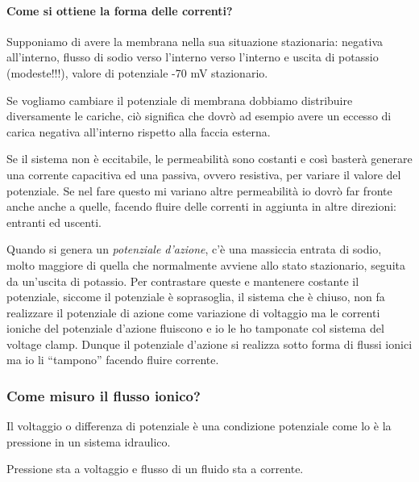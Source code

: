 \documentclass[a4paper,12pt]{article}
\begin{document}
\paragraph{Come si ottiene la forma delle correnti?}

Supponiamo di avere la membrana nella sua situazione stazionaria: negativa all’interno, flusso di sodio verso l’interno verso l’interno e uscita di potassio (modeste!!!), valore di potenziale -70 mV stazionario.

Se vogliamo cambiare il potenziale di membrana dobbiamo distribuire diversamente le cariche, ciò significa che dovrò ad esempio avere un eccesso di carica negativa all’interno rispetto alla faccia esterna. 

Se il sistema non è eccitabile, le permeabilità sono costanti e così basterà generare una corrente capacitiva ed una passiva, ovvero resistiva, per variare il valore del potenziale. Se nel fare questo mi variano altre permeabilità io dovrò far fronte anche anche a quelle, facendo fluire delle correnti in aggiunta in altre direzioni: entranti ed uscenti. 

Quando si genera un \emph{potenziale d’azione}, c’è una massiccia entrata di sodio, molto maggiore di quella che normalmente avviene allo stato stazionario, seguita da un’uscita di potassio. Per contrastare queste e mantenere costante il potenziale, siccome il potenziale è soprasoglia, il sistema che è chiuso, non fa realizzare il potenziale di azione come variazione di voltaggio ma le correnti ioniche del potenziale d’azione fluiscono e io le ho tamponate col sistema del voltage clamp. 
Dunque il potenziale d’azione si realizza sotto forma di flussi ionici ma io li “tampono” facendo fluire corrente.

\subsubsection{Come misuro il flusso ionico?}
Il voltaggio o differenza di potenziale è una condizione potenziale come lo è la pressione in un sistema idraulico.

Pressione sta a voltaggio e flusso di un fluido sta a corrente. 
\end{document}
